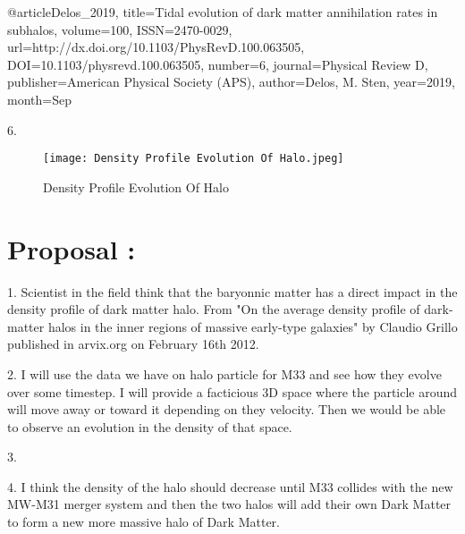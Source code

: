 \documentclass{article}
\begin{document}
\vspace{5mm}

@article{Delos_2019,
   title={Tidal evolution of dark matter annihilation rates in subhalos},
   volume={100},
   ISSN={2470-0029},
   url={http://dx.doi.org/10.1103/PhysRevD.100.063505},
   DOI={10.1103/physrevd.100.063505},
   number={6},
   journal={Physical Review D},
   publisher={American Physical Society (APS)},
   author={Delos, M. Sten},
   year={2019},
   month={Sep}
}

\vspace{5mm}

6.
\begin{figure}[htp]
    \centering
    \texttt{[image: Density Profile Evolution Of Halo.jpeg]}
    \caption{Density Profile Evolution Of Halo}
    \label{fig:galaxy}
\end{figure}

\vspace{5mm}

\maketitle
\section{Proposal :}

\vspace{5mm}

1.
Scientist in the field think that the baryonnic matter has a direct impact in the density profile of dark matter halo. From "On the average density profile of dark-matter halos in the inner regions of massive early-type galaxies" by Claudio Grillo published in arvix.org on February 16th 2012.
\vspace{5mm}

2.
I will use the data we have on halo particle for M33 and see how they evolve over some timestep. I will provide a facticious 3D space where the particle around will move away or toward it depending on they velocity. Then we would be able to observe an evolution in the density of that space.
\vspace{5mm}

3.
\vspace{5mm}

4.
I think the density of the halo should decrease until M33 collides with the new MW-M31 merger system and then the two halos will add their own Dark Matter to form a new more massive halo of Dark Matter.
\end{document}
